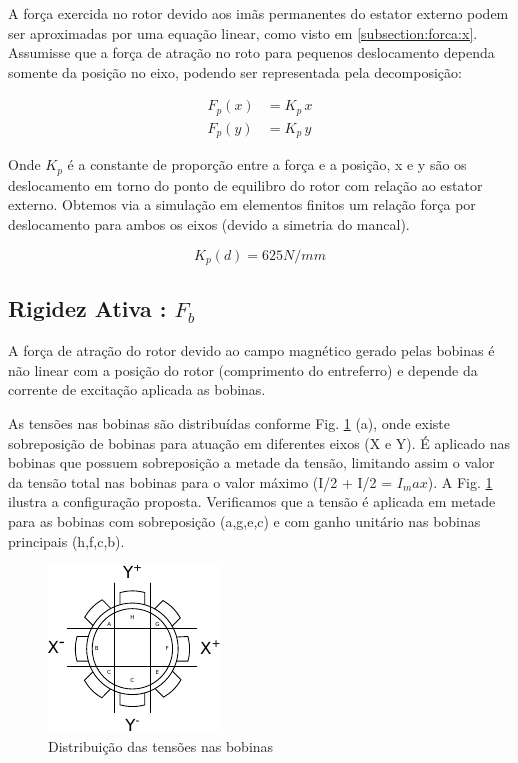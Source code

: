A força exercida no rotor devido aos imãs permanentes do estator externo podem ser aproximadas por uma equação linear, como visto em \ref{subsection:forca:x}. Assumisse que a força de atração no roto para pequenos deslocamento dependa somente da posição no eixo, podendo ser representada pela decomposição:

\begin{align}
	F_p(x) &= K_p \, x \\
	F_p(y) &= K_p \, y 
\end{align}

Onde $K_p$ é a constante de proporção entre a força e a posição, x e y são os deslocamento em torno do ponto de equilibro do rotor com relação ao estator externo. Obtemos via a simulação em elementos finitos um relação força por deslocamento para ambos os eixos (devido a simetria do mancal). 

\begin{equation}
 K_p(d) = 625 N/mm 
\end{equation}

\subsection{Rigidez Ativa : $F_b$}

A força de atração do rotor devido ao campo magnético gerado pelas bobinas é não linear com a posição do rotor (comprimento do entreferro) e depende da corrente de excitação aplicada as bobinas.  

As tensões nas bobinas são distribuídas conforme Fig. \ref{fig:blocos:tensao:bobinas:x:y} (a), onde existe sobreposição de bobinas para atuação em diferentes eixos (X e Y). É aplicado nas bobinas que possuem sobreposição a metade da tensão, limitando assim o valor da tensão total nas bobinas para o valor máximo (I/2 + I/2 = $I_max$). A Fig. \ref{fig:blocos:tensao:bobinas:x:y} ilustra a configuração proposta. Verificamos que a tensão é aplicada em metade para as bobinas com sobreposição (a,g,e,c) e com ganho unitário nas bobinas principais (h,f,c,b). 

\begin{figure}[th]
\centering
\includegraphics[width=0.7\linewidth]{./Figs/Modelagem/ativo-atuadores-conexao}
\caption{Distribuição das tensões nas bobinas}
\label{fig:blocos:tensao:bobinas:x:y}
\end{figure}

